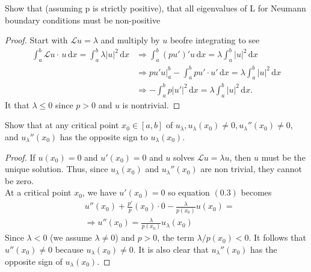 \documentclass{exam}
\begin{document}
    \begin{questions}
        \question Show that (assuming p is strictly positive), that all eigenvalues of L for Neumann
boundary conditions must be non-positive
        \begin{solution}
            \begin{proof}
                Start with $\mathcal{L}u = \lambda$ and multiply by $u$ beofre integrating to see 
                \begin{align*}
                    \int_a^b \mathcal{L}u\cdot\,u\,\mathrm{d}x = \int_a^b \lambda|u|^2\,\mathrm{d}x &\Rightarrow \int_a^b (pu')'u\,\mathrm{d}x = \lambda\int_a^b |u|^2\,\mathrm{d}x \\
                    &\Rightarrow pu'u\big|_{a}^{b} - \int_a^b pu' \cdot u'\,\mathrm{d}x = \lambda\int_a^b |u|^2\,\mathrm{d}x \\
                    &\Rightarrow -\int_a^b p|u'|^2\,\mathrm{d}x = \lambda\int_a^b |u|^2\,\mathrm{d}x.
                \end{align*}
                It that $\lambda \leq 0$ since $p > 0$ and $u$ is nontrivial. 
            \end{proof}
        \end{solution}

        \question Show that at any critical point $x_0 \in [a, b]$ of $u_\lambda, u_\lambda(x_0) \neq 0, u_\lambda''(x_0) \neq 0$, and $u_\lambda''(x_0)$ has the opposite sign to $u_\lambda(x_0)$.
        \begin{solution}
            \begin{proof}
                If $u(x_0) = 0$ and $u'(x_0) = 0$ and $u$ solves $\mathcal{L}u = \lambda u$, then $u$ must be the unique solution. Thus, since $u_{\lambda}(x_0)$ and $u_{\lambda}''(x_0)$ are non trivial, they cannot be zero. \\ At a critical point $x_0$, we have $u'(x_0) = 0$ so equation $(0.3)$ becomes 
                \begin{align*}
                    &u''(x_0) + \frac{p'}{p}(x_0) \cdot 0 - \frac{\lambda}{p(x_0)} u(x_0) = \\
                    &\Rightarrow u''(x_0) = \frac{\lambda}{p(x_0)}u_\lambda(x_0)
                \end{align*}
                Since $\lambda < 0$ (we assume $\lambda \neq 0$) and $p > 0$, the term $\lambda / p(x_0) < 0$. It follows that $u''(x_0) \neq 0$ because $u_\lambda(x_0) \neq 0$. It is also clear that $u_\lambda''(x_0)$ has the opposite sign of $u_\lambda(x_0)$.
            \end{proof}
        \end{solution}


\end{questions}
\end{document}
